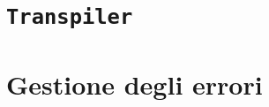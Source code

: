 
\section{\texttt{Transpiler}}
\label{sec:transpiler}

\section{Gestione degli errori}
\label{sec:gestione-degli-errori}
